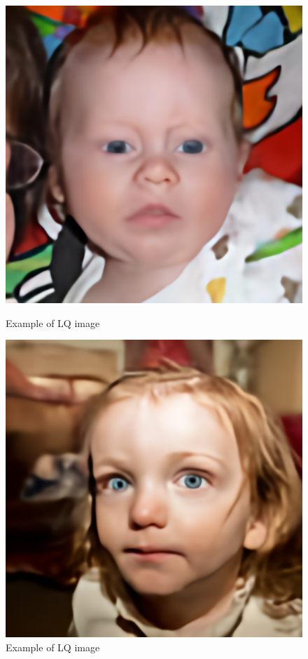 \documentclass{article}
\begin{document}
\begin{figure}[htbp]
    \centering
    \begin{minipage}{0.45\textwidth}
        \centering
        \includegraphics[width=\textwidth]{imgs/output_00328.png}
        \caption{Example of LQ image}
        \label{fig:image1}
    \end{minipage}\hfill
    \begin{minipage}{0.45\textwidth}
        \centering
        \includegraphics[width=\textwidth]{imgs/output_00386.png}
        \caption{Example of LQ image}
        \label{fig:image2}
    \end{minipage}
\end{figure}
\end{document}
